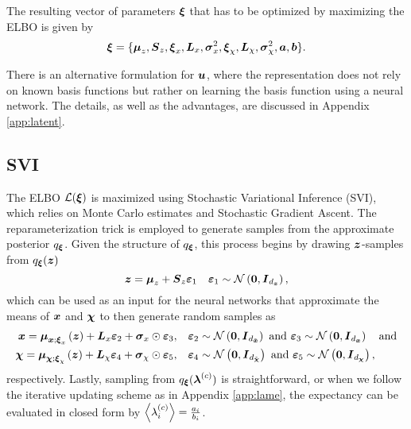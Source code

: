 The resulting vector of parameters $\boldsymbol{\xi}$ that has to be optimized by maximizing the ELBO is given by 
\begin{equation}
    \ve \xi = \{ \ve \mu_z, \ve S_z, \ve \xi_x, \ve L_x, \ve \sigma_x^2, \ve \xi_\chi, \ve L_\chi, \ve \sigma_\chi^2, \ve a, \ve b \}. %
\end{equation}

\begin{Remarks}
    \item There is an alternative formulation for $\boldsymbol{u}$, where the representation does not rely on known basis functions but rather on learning the basis function using a neural network. The details, as well as the advantages, are discussed in Appendix \ref{app:latent}.
\end{Remarks}

\subsection{SVI}
The ELBO $\mathcal{L}(\boldsymbol{\xi})$ is maximized using Stochastic Variational Inference (SVI), which relies on Monte Carlo estimates and Stochastic Gradient Ascent. The reparameterization trick is employed to generate samples from the approximate posterior $q_{\boldsymbol{\xi}}$. Given the structure of $q_{\boldsymbol{\xi}}$, this process begins by drawing $\boldsymbol{z}$-samples from $q_{\boldsymbol{\xi}}(\boldsymbol{z})$
\begin{equation}
    \boldsymbol{z} = \boldsymbol{\mu}_z + \boldsymbol{S}_z \boldsymbol{\varepsilon}_1 \quad  \boldsymbol{\varepsilon}_1 \sim \mathcal{N}\left(\boldsymbol{0}, \boldsymbol{I}_{d_{\boldsymbol{z}}}\right) ,
\end{equation}
which can be used as an input for the neural networks that approximate the means of $\boldsymbol{x}$ and $\boldsymbol{\chi}$ to then generate random samples as
\begin{align}
    \boldsymbol{x} =\boldsymbol{\mu}_{\boldsymbol{x};\boldsymbol{\xi}_x}\left( \boldsymbol{z} \right) + \boldsymbol{L}_x \boldsymbol{\varepsilon}_2+ \boldsymbol{\sigma}_x  \odot \boldsymbol{\varepsilon}_3, \quad  & \boldsymbol{\varepsilon}_2 \sim \mathcal{N}\left(\boldsymbol{0}, \boldsymbol{I}_{d_{\tilde{\boldsymbol{x}}}}\right) \mathrm{ \ and \ } \boldsymbol{\varepsilon}_3 \sim \mathcal{N}\left(\boldsymbol{0}, \boldsymbol{I}_{d_{\boldsymbol{x}}}\right) \quad \mathrm{and} \\
    \boldsymbol{\chi} =\boldsymbol{\mu}_{\boldsymbol{\chi};\boldsymbol{\xi}_\chi}\left( \boldsymbol{z} \right) + \boldsymbol{L}_\chi \boldsymbol{\varepsilon}_4+ \boldsymbol{\sigma}_\chi  \odot \boldsymbol{\varepsilon}_5, \quad  & \boldsymbol{\varepsilon}_4 \sim \mathcal{N}\left(\boldsymbol{0}, \boldsymbol{I}_{d_{\tilde{\boldsymbol{\chi}}}}\right) \mathrm{ \ and \ } \boldsymbol{\varepsilon}_5 \sim \mathcal{N}\left(\boldsymbol{0}, \boldsymbol{I}_{d_{\boldsymbol{\chi}}}\right),
\end{align}
respectively. Lastly, sampling from $q_{\boldsymbol{\xi}}(\boldsymbol{\lambda}^{(c)})$ is straightforward, or when we follow the iterative updating scheme as in Appendix \ref{app:lame}, the expectancy can be evaluated in closed form by $\left< \lambda^{(c)}_i \right> = \frac{a_i}{b_i}$.

